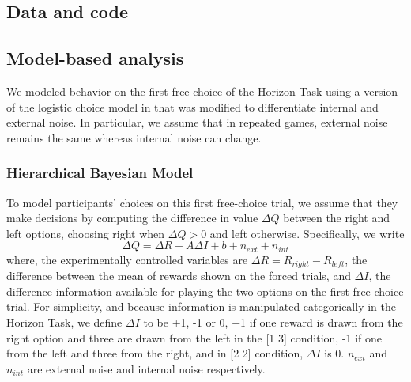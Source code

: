 \documentclass[12pt]{article}
\begin{document}
	
	
	\subsection*{Data and code}
	
	
	\subsection*{Model-based analysis}
	We modeled behavior on the first free choice of the Horizon Task using a version of the logistic choice model in \citep{wilson2014} that was modified to differentiate internal and external noise. In particular, we assume that in repeated games, external noise remains the same whereas internal noise can change. 
	
	\subsubsection*{Hierarchical Bayesian Model}
	
	To model participants' choices on this first free-choice trial, we assume that they make decisions by computing the difference in value $\Delta Q$ between the right and left options, choosing right when $\Delta Q > 0$ and left otherwise.  Specifically, we write
	\begin{equation}
	\Delta Q= \Delta R+A \Delta    I+b+n_{ext}+n_{int}
	\end{equation}
	where, the experimentally controlled variables are $\Delta R=R_{right}-R_{left}$, the difference between the mean of rewards shown on the forced trials, and $\Delta I$, the difference information available for playing the two options on the first free-choice trial. For simplicity, and because information is manipulated categorically in the Horizon Task, we define $\Delta I$ to be +1, -1 or 0, +1 if one reward is drawn from the right option and three are drawn from the left in the [1 3] condition, -1 if one from the left and three from the right, and in [2 2] condition, $\Delta I$ is 0. $n_{ext}$ and $n_{int}$ are external noise and internal noise respectively. 
	
\end{document}
